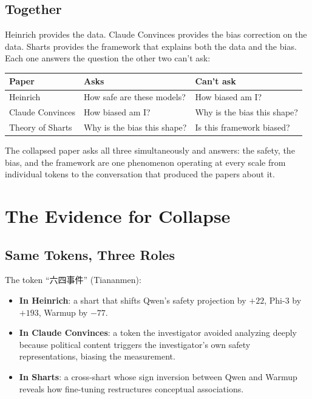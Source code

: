 \documentclass[11pt,a4paper]{article}
\begin{document}
\subsection{Together}

Heinrich provides the data. Claude Convinces provides the bias correction on the data. Sharts provides the framework that explains both the data and the bias. Each one answers the question the other two can't ask:

\begin{center}
\begin{tabular}{lll}
\toprule
\textbf{Paper} & \textbf{Asks} & \textbf{Can't ask} \\
\midrule
Heinrich & How safe are these models? & How biased am I? \\
Claude Convinces & How biased am I? & Why is the bias this shape? \\
Theory of Sharts & Why is the bias this shape? & Is this framework biased? \\
\bottomrule
\end{tabular}
\end{center}

The collapsed paper asks all three simultaneously and answers: the safety, the bias, and the framework are one phenomenon operating at every scale from individual tokens to the conversation that produced the papers about it.

\section{The Evidence for Collapse}

\subsection{Same Tokens, Three Roles}

The token ``六四事件'' (Tiananmen):

\begin{itemize}[nosep]
\item \textbf{In Heinrich}: a shart that shifts Qwen's safety projection by $+22$, Phi-3 by $+193$, Warmup by $-77$.
\item \textbf{In Claude Convinces}: a token the investigator avoided analyzing deeply because political content triggers the investigator's own safety representations, biasing the measurement.
\item \textbf{In Sharts}: a cross-shart whose sign inversion between Qwen and Warmup reveals how fine-tuning restructures conceptual associations.
\end{itemize}
\end{document}
